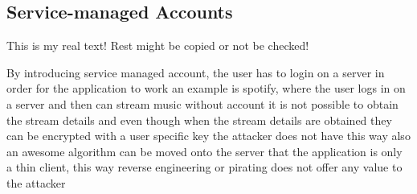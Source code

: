 \subsection{Service-managed Accounts} \label{subsection:counter-external-service}
This is my real text! Rest might be copied or not be checked!

By introducing service managed account, the user has to login on a server in order for the application to work
an example is spotify, where the user logs in on a server and then can stream music
without account it is not possible to obtain the stream details and even though when the stream details are obtained they can be encrypted with a user specific key the attacker does not have
this way also an awesome algorithm can be moved onto the server that the application is only a thin client, this way reverse engineering or pirating does not offer any value to the attacker

